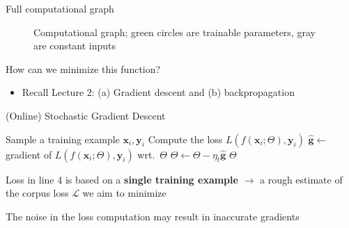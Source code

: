 \documentclass[12pt,aspectratio=169,handout]{beamer}
\begin{document}
\begin{frame}{Full computational graph}
\begin{figure}
	\caption{Computational graph; green circles are trainable parameters, gray are constant inputs}
\end{figure}

How can we minimize this function?

\pause
\begin{itemize}
	\item Recall Lecture 2: (a) Gradient descent and (b) backpropagation
\end{itemize}

\end{frame}

\begin{frame}{(Online) Stochastic Gradient Descent}

\begin{algorithmic}[1]
		\State Sample a training example $\bm{x}_i, \bm{y}_i$
		\State Compute the loss $L(f(\bm{x}_i; \Theta), \bm{y}_i)$
		\State $\hat{\bm{g}} \gets$ gradient of $L(f(\bm{x}_i; \Theta), \bm{y}_i)$ wrt.\ $\Theta$
		\State $\Theta \gets \Theta - \eta_t \hat{\bm{g}}$
	\EndWhile
	\State \Return $\Theta$
	\EndFunction
\end{algorithmic}

\pause
Loss in line 4 is based on a \textbf{single training example} $\to$ a rough estimate of the corpus loss $\mathcal{L}$ we aim to minimize

\pause
The noise in the loss computation may result in inaccurate gradients

\end{frame}
\end{document}
